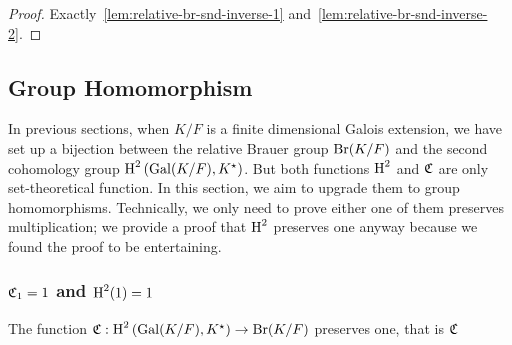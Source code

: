 \begin{proof}
  Exactly~\cref{lem:relative-br-snd-inverse-1} and~\cref{lem:relative-br-snd-inverse-2}.
\end{proof}

\subsection{Group Homomorphism}

In previous sections, when $K/F$ is a finite dimensional Galois extension, we have set up a bijection between the relative Brauer group $\operatorname{Br}(K/F)$ and the second cohomology group $\operatorname{H}^{2}\left(\operatorname{Gal}(K/F), K^{\star}\right)$. But both functions $\operatorname{H}^{2}$ and $\operatorname{\mathfrak{C}}$ are only set-theoretical function. In this section, we aim to upgrade them to group homomorphisms. Technically, we only need to prove either one of them preserves multiplication; we provide a proof that $\operatorname{H}^{2}$ preserves one anyway because we found the proof to be entertaining.

\subsubsection{$\operatorname{\mathfrak{C}}_{1} = 1$ and $\operatorname{H}^{2}(1) = 1$}

\begin{theorem}
  \label{thm:map_one}
  The function $\operatorname{\mathfrak{C}}:\operatorname{H}^{2}\left(\operatorname{Gal}(K/F), K^{\star}\right) \to \operatorname{Br}(K/F)$ preserves one, that is $\operatorname{\mathfrak{C}}_{}$
 \leanok
\end{theorem}

